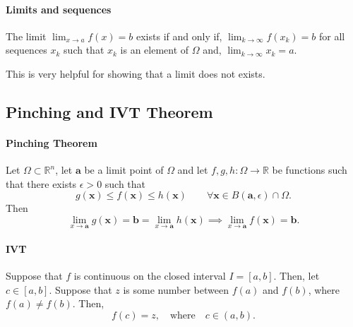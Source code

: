\paragraph{Limits and sequences}
The limit \(\lim_{x\to a} f(x) = b\) exists if and only if,
\(\lim_{k\to\infty} f(x_k) = b\)  for all sequences \({x_k}\) such that 
\(x_k\) is an element of \(\Omega\) and,
\(\lim_{k\to\infty} x_k = a\).

This is very helpful for showing that a limit does not exists.

\subsection{Pinching and IVT Theorem}

\paragraph{Pinching Theorem}
Let \(\Omega \subset \mathbb{R}^n\), let \(\textbf{a}\) be a limit point of \(\Omega\)
and let \(f,g ,h: \Omega \rightarrow \mathbb{R}\) be functions such that there exists
\(\epsilon > 0\) such that
\[
    g(\textbf{x}) \leq f(\textbf{x}) \leq h(\textbf{x}) \qquad
    \forall \textbf{x} \in B(\textbf{a}, \epsilon) \cap \Omega.
\]
Then
\[
    \lim_{x\to \textbf{a}} g(\textbf{x}) = \textbf{b} = \lim_{x\to \textbf{a}} h(\textbf{x})
    \implies \lim_{x\to \textbf{a}} f(\textbf{x}) = \textbf{b}.
\]

\paragraph{IVT}
Suppose that \(f\) is continuous on the closed interval  \(I = [a, b]\). Then,
let  \(c \in [a, b]\). Suppose that \(z\) is some number between \(f(a)\) and
\(f(b)\), where  \(f(a) \neq f(b)\).
Then, \[
    f(c) = z, \quad \text{where} \quad c \in (a, b)
.\] 

